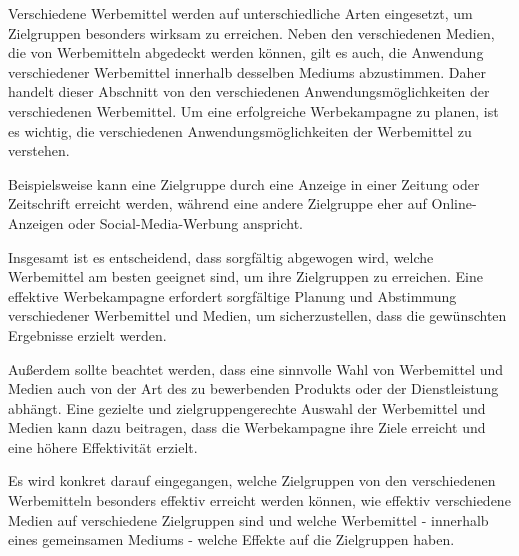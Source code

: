 \begin{refsection}
  
Verschiedene Werbemittel werden auf unterschiedliche Arten eingesetzt, um Zielgruppen besonders wirksam zu erreichen. Neben den verschiedenen Medien, die von Werbemitteln abgedeckt werden können, gilt es auch, die Anwendung verschiedener Werbemittel innerhalb desselben Mediums abzustimmen. Daher handelt dieser Abschnitt von den verschiedenen Anwendungsmöglichkeiten der verschiedenen Werbemittel. Um eine erfolgreiche Werbekampagne zu planen, ist es wichtig, die verschiedenen Anwendungsmöglichkeiten der Werbemittel zu verstehen. 

Beispielsweise kann eine Zielgruppe durch eine Anzeige in einer Zeitung oder Zeitschrift erreicht werden, während eine andere Zielgruppe eher  auf Online-Anzeigen oder Social-Media-Werbung anspricht.

Insgesamt ist es entscheidend, dass sorgfältig abgewogen wird, welche Werbemittel am besten geeignet sind, um ihre Zielgruppen zu erreichen. Eine effektive Werbekampagne erfordert sorgfältige Planung und Abstimmung verschiedener Werbemittel und Medien, um sicherzustellen, dass die gewünschten Ergebnisse erzielt werden.

Außerdem sollte beachtet werden, dass eine sinnvolle Wahl von Werbemittel und Medien auch von der Art des zu bewerbenden Produkts oder der Dienstleistung abhängt. Eine gezielte und zielgruppengerechte Auswahl der Werbemittel und Medien kann dazu beitragen, dass die Werbekampagne ihre Ziele erreicht und eine höhere Effektivität erzielt.

Es wird konkret darauf eingegangen, welche Zielgruppen von den verschiedenen Werbemitteln besonders effektiv erreicht werden können, wie effektiv verschiedene Medien auf verschiedene Zielgruppen sind und welche Werbemittel - innerhalb eines gemeinsamen Mediums - welche Effekte auf die Zielgruppen haben.

  \clearpage
  \printbibliography[heading=subsubbibliography]
\end{refsection}
\clearpage
